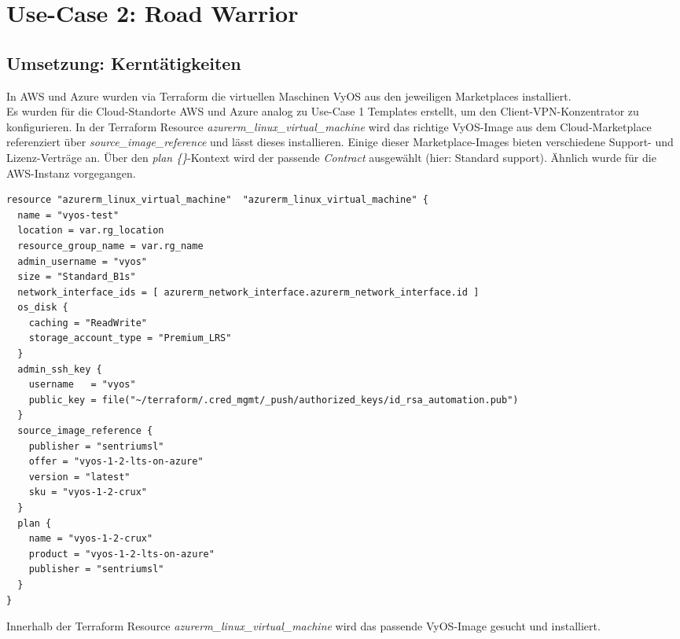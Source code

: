 \section{Use-Case 2: Road Warrior} \label{Use-Case 2: Road Warrior}

\subsection{Umsetzung: Kerntätigkeiten}


In AWS und Azure wurden via Terraform die virtuellen Maschinen VyOS aus den jeweiligen Marketplaces installiert.\\
Es wurden für die Cloud-Standorte AWS und Azure analog zu Use-Case 1 Templates erstellt, um den Client-VPN-Konzentrator zu konfigurieren. In der Terraform Resource \textit{azurerm\_linux\_virtual\_machine} wird das richtige VyOS-Image aus dem Cloud-Marketplace referenziert über \textit{source\_image\_reference} und lässt dieses installieren. Einige dieser Marketplace-Images bieten verschiedene Support- und Lizenz-Verträge an. Über den \textit{plan \{\}}-Kontext wird der passende \textit{Contract} ausgewählt (hier: \glqq Standard support\grqq{}). Ähnlich wurde für die AWS-Instanz vorgegangen. 
\begin{listing}[h]
\begin{verbatim}
resource "azurerm_linux_virtual_machine"  "azurerm_linux_virtual_machine" {
  name = "vyos-test"
  location = var.rg_location
  resource_group_name = var.rg_name
  admin_username = "vyos"
  size = "Standard_B1s"
  network_interface_ids = [ azurerm_network_interface.azurerm_network_interface.id ]
  os_disk {
    caching = "ReadWrite"
    storage_account_type = "Premium_LRS"
  }
  admin_ssh_key {
    username   = "vyos"
    public_key = file("~/terraform/.cred_mgmt/_push/authorized_keys/id_rsa_automation.pub")
  }
  source_image_reference {
    publisher = "sentriumsl"
    offer = "vyos-1-2-lts-on-azure"
    version = "latest"
    sku = "vyos-1-2-crux"
  }
  plan {
    name = "vyos-1-2-crux"
    product = "vyos-1-2-lts-on-azure"
    publisher = "sentriumsl"
  }
}
\end{verbatim}
\caption{Innerhalb der Terraform Resource \textit{azurerm\_linux\_virtual\_machine} wird das passende VyOS-Image gesucht und installiert.}
\label{tf-azure-vyos-machine-image}
\end{listing}\FloatBarrier
